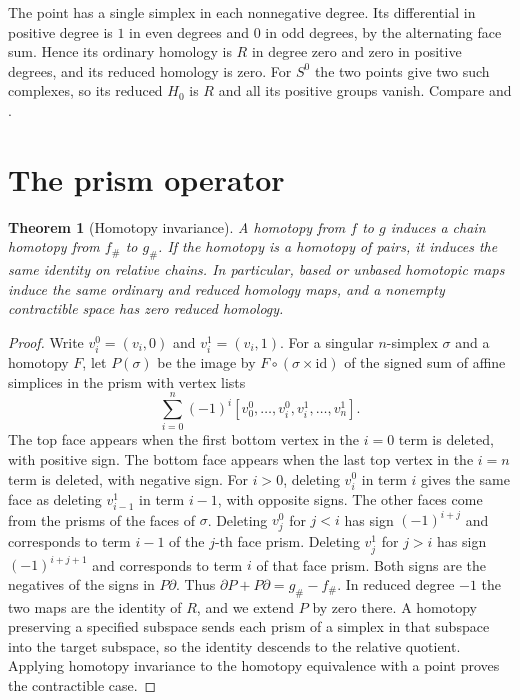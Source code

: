 \documentclass[11pt,oneside,openany]{book}
\theoremstyle{plain}
\newtheorem{theorem}{Theorem}[chapter]
\theoremstyle{definition}
\theoremstyle{remark}
\begin{document}
The point has a single simplex in each nonnegative degree.
Its differential in positive degree is \(1\) in even degrees
and \(0\) in odd degrees, by the alternating face sum. Hence
its ordinary homology is \(R\) in degree zero and zero in
positive degrees, and its reduced homology is zero.
For \(S^0\) the two points give two such complexes,
so its reduced \(H_0\) is \(R\) and all its positive groups
vanish. Compare \cite[Section 2.1]{Hatcher}
and \cite[Sections 4.2 and 6.3]{MKP}.

\section{The prism operator}\label{p202:T15}

\begin{theorem}[Homotopy invariance]
\label{thm:p202-prism}
A homotopy from \(f\) to \(g\) induces a chain homotopy
from \(f_\#\) to \(g_\#\). If the homotopy is a homotopy
of pairs, it induces the same identity on relative
chains. In particular, based or unbased homotopic maps
induce the same ordinary and reduced homology maps,
and a nonempty contractible space has zero reduced homology.
\end{theorem}

\begin{proof}
Write \(v_i^0=(v_i,0)\) and \(v_i^1=(v_i,1)\).
For a singular \(n\)-simplex \(\sigma\) and a homotopy
\(F\), let \(P(\sigma)\) be the image by
\(F\circ(\sigma\times\mathrm{id})\) of the signed sum
of affine simplices in the prism with vertex lists
\[
 \sum_{i=0}^{n}(-1)^i
 [v_0^0,\ldots,v_i^0,v_i^1,\ldots,v_n^1].
\]
The top face appears when the first bottom vertex in the
\(i=0\) term is deleted, with positive sign. The bottom
face appears when the last top vertex in the \(i=n\) term
is deleted, with negative sign. For \(i>0\), deleting
\(v_i^0\) in term \(i\) gives the same face as deleting
\(v_{i-1}^1\) in term \(i-1\), with opposite signs.
The other faces come from the prisms of the faces of
\(\sigma\). Deleting \(v_j^0\) for \(j<i\) has sign
\((-1)^{i+j}\) and corresponds to term \(i-1\) of the
\(j\)-th face prism. Deleting \(v_j^1\) for \(j>i\)
has sign \((-1)^{i+j+1}\) and corresponds to term \(i\)
of that face prism. Both signs are the negatives of the
signs in \(P\partial\). Thus
\(\partial P+P\partial=g_\#-f_\#\).
In reduced degree \(-1\) the two maps are the identity
of \(R\), and we extend \(P\) by zero there. A homotopy
preserving a specified subspace sends each prism of
a simplex in that subspace into the target subspace, so
the identity descends to the relative quotient. Applying
homotopy invariance to the homotopy equivalence with
a point proves the contractible case.
\end{proof}
\end{document}
